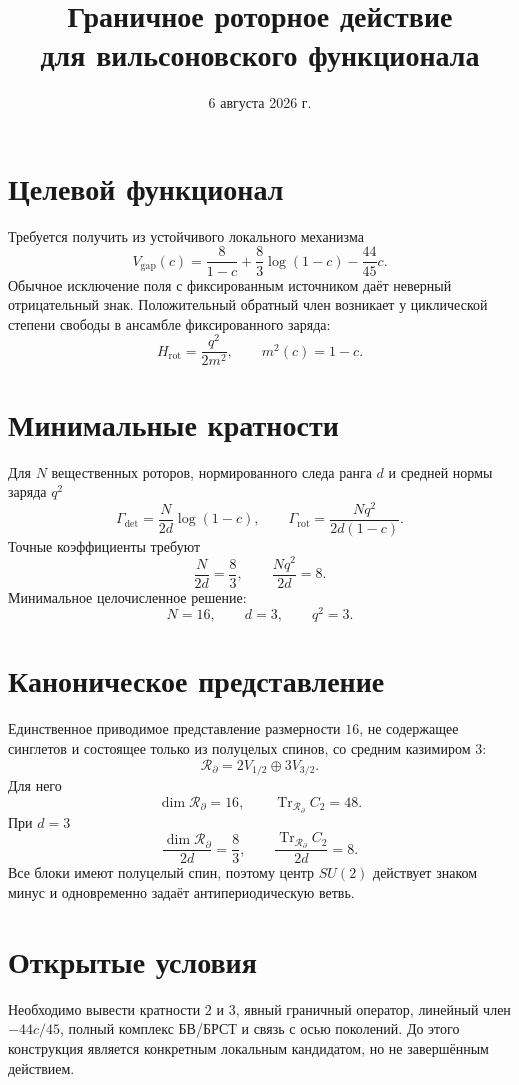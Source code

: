 \documentclass[12pt,a4paper]{article}
\title{Граничное роторное действие\\для вильсоновского функционала}
\author{}
\date{6 августа 2026 г.}
\DeclareMathOperator{\Tr}{Tr}
\begin{document}
\maketitle

\section{Целевой функционал}

Требуется получить из устойчивого локального механизма
\begin{equation}
 V_{\mathrm{gap}}(c)
 =\frac8{1-c}+\frac83\log(1-c)-\frac{44}{45}c.
\end{equation}
Обычное исключение поля с фиксированным источником даёт неверный
отрицательный знак. Положительный обратный член возникает у циклической
степени свободы в ансамбле фиксированного заряда:
\begin{equation}
 H_{\mathrm{rot}}=\frac{q^2}{2m^2},
 \qquad m^2(c)=1-c.
\end{equation}

\section{Минимальные кратности}

Для \(N\) вещественных роторов, нормированного следа ранга \(d\) и средней
нормы заряда \(q^2\)
\begin{equation}
 \Gamma_{\det}=\frac{N}{2d}\log(1-c),
 \qquad
 \Gamma_{\mathrm{rot}}=\frac{Nq^2}{2d(1-c)}.
\end{equation}
Точные коэффициенты требуют
\begin{equation}
 \frac{N}{2d}=\frac83,
 \qquad
 \frac{Nq^2}{2d}=8.
\end{equation}
Минимальное целочисленное решение:
\begin{equation}
 N=16,\qquad d=3,\qquad q^2=3.
\end{equation}

\section{Каноническое представление}

Единственное приводимое представление размерности \(16\), не содержащее
синглетов и состоящее только из полуцелых спинов, со средним казимиром \(3\):
\begin{equation}
 \boxed{\mathcal R_{\partial}=2V_{1/2}\oplus3V_{3/2}.}
\end{equation}
Для него
\begin{equation}
 \dim\mathcal R_{\partial}=16,
 \qquad
 \Tr_{\mathcal R_{\partial}}C_2=48.
\end{equation}
При \(d=3\)
\begin{equation}
 \frac{\dim\mathcal R_{\partial}}{2d}=\frac83,
 \qquad
 \frac{\Tr_{\mathcal R_{\partial}}C_2}{2d}=8.
\end{equation}
Все блоки имеют полуцелый спин, поэтому центр \(SU(2)\) действует знаком
минус и одновременно задаёт антипериодическую ветвь.

\section{Открытые условия}

Необходимо вывести кратности \(2\) и \(3\), явный граничный оператор,
линейный член \(-44c/45\), полный комплекс БВ/БРСТ и связь с осью поколений.
До этого конструкция является конкретным локальным кандидатом, но не
завершённым действием.
\end{document}
